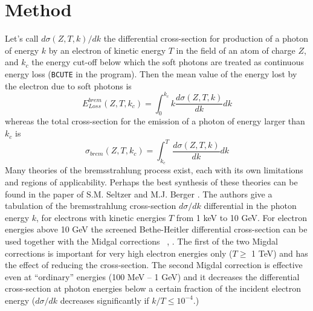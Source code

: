\section{Method}
Let's call $d\sigma(Z,T,k)/dk$ the differential cross-section for
production of a photon of energy $k$ by an electron of kinetic energy
$T$ in the field of an atom of charge $Z$, and
$k_c$ the energy cut-off below which the soft photons are treated
as continuous energy loss ({\tt BCUTE} in the program).
Then the mean value of the energy lost by the electron due
to soft photons is
\begin{equation}
  E_{Loss}^{brem} (Z,T,k_c ) = 
\int_{0}^{k_ c}k\frac{d \sigma (Z,T,k)}{dk}dk
\end{equation}
whereas the total cross-section for the emission of 
a photon of energy larger than $k_c$ is
\begin{equation}
 \sigma_{brem} (Z,T,k_c ) = \int_{k_c}^{T}\frac{d \sigma (Z,T,k)}{dk} dk
\end{equation}
Many theories of the bremsstrahlung process exist, each with its own
limitations and regions of applicability. Perhaps the best synthesis
of these theories can be found in the paper of S.M. Seltzer and M.J.
Berger \cite{bib-SEL1}. The authors give a tabulation of the
bremsstrahlung cross-section $d\sigma/dk$ differential in the photon
energy $k$, for electrons with kinetic energies $T$ from 1 keV to 10
GeV. For electron energies above 10 GeV the screened Bethe-Heitler
differential cross-section can be used
together with the Midgal 
corrections~%
                      {\cite{bib-MES1}, \cite{bib-MIGD}}.  
The first of the two Migdal corrections is
important for very high electron energies only ($T \geq$ 1 TeV) and
has the effect of reducing the cross-section.  The second Migdal
correction is effective even at ``ordinary'' energies (100 MeV -- 1
GeV) and it decreases the differential cross-section at photon
energies below a certain fraction of the incident electron energy
($d\sigma/dk$ decreases significantly if $ k/T \leq 10^{-4}$.)

